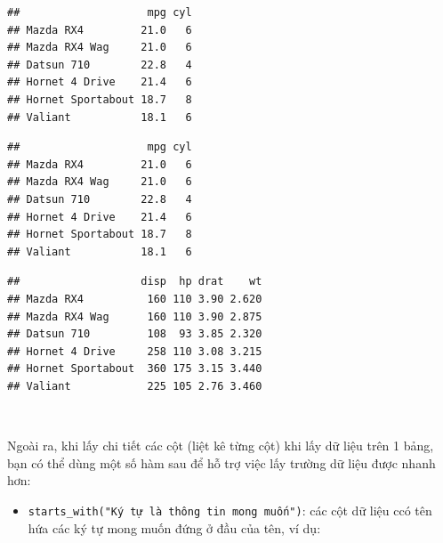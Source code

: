 \documentclass[]{krantz}
\makeatletter
\newenvironment{Shaded}{\begin{snugshade}}{\end{snugshade}}
\newcommand{\CommentTok}[1]{\textcolor[rgb]{0.37,0.37,0.37}{\textit{#1}}}
\newcommand{\DecValTok}[1]{\textcolor[rgb]{0.06,0.06,0.06}{#1}}
\newcommand{\KeywordTok}[1]{\textcolor[rgb]{0.27,0.27,0.27}{\textbf{#1}}}
\newcommand{\NormalTok}[1]{#1}
\newcommand{\OperatorTok}[1]{\textcolor[rgb]{0.43,0.43,0.43}{\textbf{#1}}}
\newcommand{\StringTok}[1]{\textcolor[rgb]{0.5,0.5,0.5}{#1}}
\providecommand{\tightlist}{%
  \setlength{\itemsep}{0pt}\setlength{\parskip}{0pt}}
\newenvironment{kframe}{%
\medskip{}
\setlength{\fboxsep}{.8em}
 \def\at@end@of@kframe{}%
 \ifinner\ifhmode%
  \def\at@end@of@kframe{\end{minipage}}%
  \begin{minipage}{\columnwidth}%
 \fi\fi%
 \def\FrameCommand##1{\hskip\@totalleftmargin \hskip-\fboxsep
 \colorbox{shadecolor}{##1}\hskip-\fboxsep
     \hskip-\linewidth \hskip-\@totalleftmargin \hskip\columnwidth}%
 \MakeFramed {\advance\hsize-\width
   \@totalleftmargin\z@ \linewidth\hsize
   \@setminipage}}%
 {\par\unskip\endMakeFramed%
 \at@end@of@kframe}
\renewenvironment{Shaded}{\begin{kframe}}{\end{kframe}}
\renewenvironment{Shaded}{\begin{snugshade}}{\end{snugshade}}
\renewcommand{\CommentTok}[1]{\textcolor[rgb]{0.56,0.35,0.01}{\textit{#1}}}
\renewcommand{\DecValTok}[1]{\textcolor[rgb]{0.00,0.00,0.81}{#1}}
\renewcommand{\KeywordTok}[1]{\textcolor[rgb]{0.13,0.29,0.53}{\textbf{#1}}}
\renewcommand{\NormalTok}[1]{#1}
\renewcommand{\OperatorTok}[1]{\textcolor[rgb]{0.81,0.36,0.00}{\textbf{#1}}}
\renewcommand{\StringTok}[1]{\textcolor[rgb]{0.31,0.60,0.02}{#1}}
\theoremstyle{definition}
\theoremstyle{definition}
\theoremstyle{definition}
\theoremstyle{remark}
\makeatother
\begin{document}
\begin{verbatim}
##                    mpg cyl
## Mazda RX4         21.0   6
## Mazda RX4 Wag     21.0   6
## Datsun 710        22.8   4
## Hornet 4 Drive    21.4   6
## Hornet Sportabout 18.7   8
## Valiant           18.1   6
\end{verbatim}

\begin{Shaded}
\end{Shaded}

\begin{verbatim}
##                    mpg cyl
## Mazda RX4         21.0   6
## Mazda RX4 Wag     21.0   6
## Datsun 710        22.8   4
## Hornet 4 Drive    21.4   6
## Hornet Sportabout 18.7   8
## Valiant           18.1   6
\end{verbatim}

\begin{Shaded}
\end{Shaded}

\begin{verbatim}
##                   disp  hp drat    wt
## Mazda RX4          160 110 3.90 2.620
## Mazda RX4 Wag      160 110 3.90 2.875
## Datsun 710         108  93 3.85 2.320
## Hornet 4 Drive     258 110 3.08 3.215
## Hornet Sportabout  360 175 3.15 3.440
## Valiant            225 105 2.76 3.460
\end{verbatim}

~

Ngoài ra, khi lấy chi tiết các cột (liệt kê từng cột) khi lấy dữ liệu
trên 1 bảng, bạn có thể dùng một số hàm sau để hỗ trợ việc lấy trường dữ
liệu được nhanh hơn:

\begin{itemize}
\tightlist
\item
  \texttt{starts\_with("Ký\ tự\ là\ thông\ tin\ mong\ muốn")}: các cột
  dữ liệu ccó tên hứa các ký tự mong muốn đứng ở đầu của tên, ví dụ:
\end{itemize}
\end{document}
